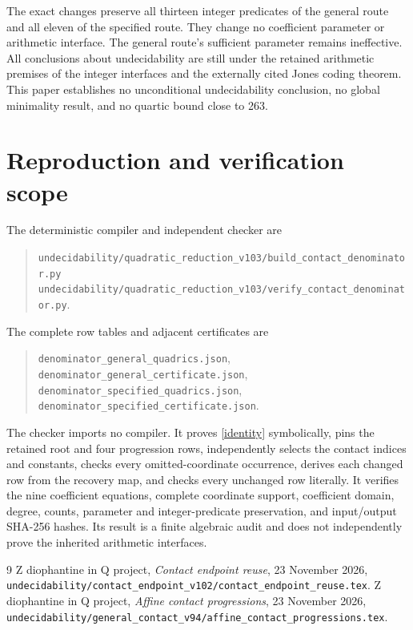 \documentclass[11pt]{article}
\begin{document}
The exact changes preserve all thirteen integer predicates of the
general route and all eleven of the specified route. They change no
coefficient parameter or arithmetic interface. The general route's
sufficient parameter remains ineffective. All conclusions about
undecidability are still under the retained arithmetic premises of the
integer interfaces and the externally cited Jones coding theorem.
This paper establishes no unconditional undecidability conclusion,
no global minimality result, and no quartic bound close to 263.

\section{Reproduction and verification scope}

The deterministic compiler and independent checker are
\begin{quote}\small
\nolinkurl{undecidability/quadratic_reduction_v103/build_contact_denominator.py}\\
\nolinkurl{undecidability/quadratic_reduction_v103/verify_contact_denominator.py}.
\end{quote}
The complete row tables and adjacent certificates are
\begin{quote}\small
\nolinkurl{denominator_general_quadrics.json},\quad
\nolinkurl{denominator_general_certificate.json},\\
\nolinkurl{denominator_specified_quadrics.json},\quad
\nolinkurl{denominator_specified_certificate.json}.
\end{quote}
The checker imports no compiler. It proves \eqref{identity} symbolically,
pins the retained root and four progression rows, independently selects
the contact indices and constants, checks every omitted-coordinate
occurrence, derives each changed row from the recovery map, and checks
every unchanged row literally. It verifies the nine coefficient equations,
complete coordinate support, coefficient domain, degree, counts, parameter
and integer-predicate preservation, and input/output SHA-256 hashes.
Its result is a finite algebraic audit and does not independently prove
the inherited arithmetic interfaces.

\begin{thebibliography}{9}
 Z diophantine in Q project,
\emph{Contact endpoint reuse}, 23 November 2026,
\nolinkurl{undecidability/contact_endpoint_v102/contact_endpoint_reuse.tex}.
 Z diophantine in Q project,
\emph{Affine contact progressions}, 23 November 2026,
\nolinkurl{undecidability/general_contact_v94/affine_contact_progressions.tex}.
\end{thebibliography}
\end{document}

